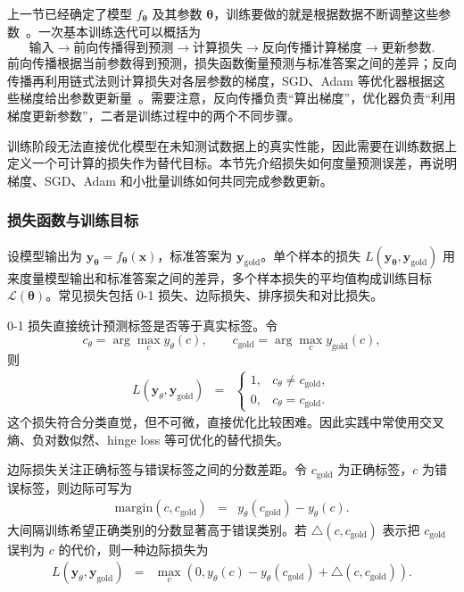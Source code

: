 上一节已经确定了模型 $f_{\boldsymbol{\theta}}$ 及其参数 $\boldsymbol{\theta}$，训练要做的就是根据数据不断调整这些参数~\cite{Mitchell:1997}。一次基本训练迭代可以概括为
\[
\text{输入}
\longrightarrow
\text{前向传播得到预测}
\longrightarrow
\text{计算损失}
\longrightarrow
\text{反向传播计算梯度}
\longrightarrow
\text{更新参数}.
\]
前向传播根据当前参数得到预测，损失函数衡量预测与标准答案之间的差异；反向传播再利用链式法则计算损失对各层参数的梯度，SGD、Adam 等优化器根据这些梯度给出参数更新量~\cite{RumelhartEtAl1986Backprop,KingmaBa2015Adam}。需要注意，反向传播负责“算出梯度”，优化器负责“利用梯度更新参数”，二者是训练过程中的两个不同步骤。

训练阶段无法直接优化模型在未知测试数据上的真实性能，因此需要在训练数据上定义一个可计算的损失作为替代目标。本节先介绍损失如何度量预测误差，再说明梯度、SGD、Adam 和小批量训练如何共同完成参数更新。

\subsubsection{损失函数与训练目标}

设模型输出为 $\mathbf{y}_{\boldsymbol{\theta}}=f_{\boldsymbol{\theta}}(\mathbf{x})$，标准答案为 $\mathbf{y}_{\mathrm{gold}}$。单个样本的损失 $L(\mathbf{y}_{\boldsymbol{\theta}},\mathbf{y}_{\mathrm{gold}})$ 用来度量模型输出和标准答案之间的差异，多个样本损失的平均值构成训练目标 $\mathcal{L}(\boldsymbol{\theta})$。常见损失包括 0-1 损失、边际损失、排序损失和对比损失。

0-1 损失直接统计预测标签是否等于真实标签。令
\[
c_{\theta}=\arg\max_c y_{\theta}(c),
\qquad
c_{\mathrm{gold}}=\arg\max_c y_{\mathrm{gold}}(c),
\]
则
\begin{eqnarray}
L(\mathbf{y}_{\theta},\mathbf{y}_{\mathrm{gold}})
& = &
\begin{cases}
1, & c_{\theta}\neq c_{\mathrm{gold}},\\
0, & c_{\theta}=c_{\mathrm{gold}}.
\end{cases}
\end{eqnarray}
这个损失符合分类直觉，但不可微，直接优化比较困难。因此实践中常使用交叉熵、负对数似然、hinge loss 等可优化的替代损失。

边际损失关注正确标签与错误标签之间的分数差距。令 $c_{\mathrm{gold}}$ 为正确标签，$c$ 为错误标签，则边际可写为
\begin{eqnarray}
\mathrm{margin}(c,c_{\mathrm{gold}})
& = &
y_{\theta}(c_{\mathrm{gold}})-y_{\theta}(c).
\end{eqnarray}
大间隔训练希望正确类别的分数显著高于错误类别。若 $\bigtriangleup(c,c_{\mathrm{gold}})$ 表示把 $c_{\mathrm{gold}}$ 误判为 $c$ 的代价，则一种边际损失为~\cite{Collobert-and-Weston:2008AUA}
\begin{eqnarray}
L(\mathbf{y}_{\theta},\mathbf{y}_{\mathrm{gold}})
& = &
\max_c
\left(
0,
y_{\theta}(c)-y_{\theta}(c_{\mathrm{gold}})
+\bigtriangleup(c,c_{\mathrm{gold}})
\right).
\end{eqnarray}

